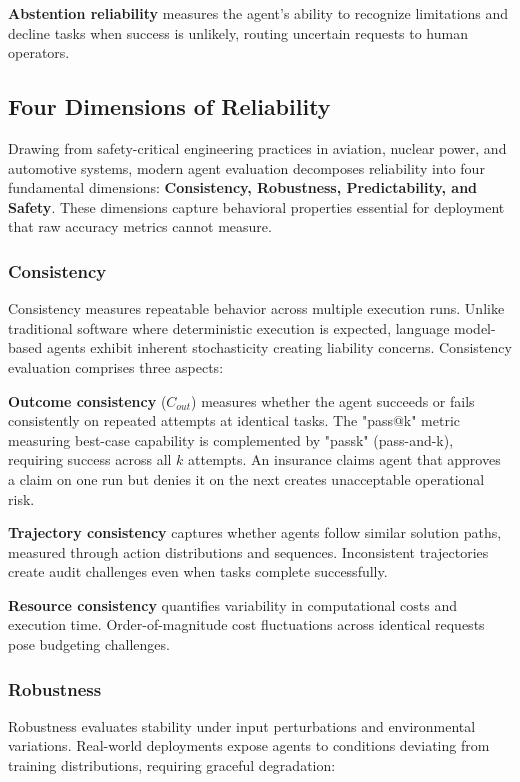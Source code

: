 \textbf{Abstention reliability} measures the agent's ability to recognize limitations and decline tasks when success is unlikely, routing uncertain requests to human operators.

\subsection{Four Dimensions of Reliability}

Drawing from safety-critical engineering practices in aviation, nuclear power, and automotive systems, modern agent evaluation decomposes reliability into four fundamental dimensions: \textbf{Consistency, Robustness, Predictability, and Safety}. These dimensions capture behavioral properties essential for deployment that raw accuracy metrics cannot measure.

\subsubsection{Consistency}

Consistency measures repeatable behavior across multiple execution runs. Unlike traditional software where deterministic execution is expected, language model-based agents exhibit inherent stochasticity creating liability concerns. Consistency evaluation comprises three aspects:

\textbf{Outcome consistency} ($C_{out}$) measures whether the agent succeeds or fails consistently on repeated attempts at identical tasks. The "pass@k" metric measuring best-case capability is complemented by "passk" (pass-and-k), requiring success across all $k$ attempts. An insurance claims agent that approves a claim on one run but denies it on the next creates unacceptable operational risk.

\textbf{Trajectory consistency} captures whether agents follow similar solution paths, measured through action distributions and sequences. Inconsistent trajectories create audit challenges even when tasks complete successfully.

\textbf{Resource consistency} quantifies variability in computational costs and execution time. Order-of-magnitude cost fluctuations across identical requests pose budgeting challenges.

\subsubsection{Robustness}

Robustness evaluates stability under input perturbations and environmental variations. Real-world deployments expose agents to conditions deviating from training distributions, requiring graceful degradation:

